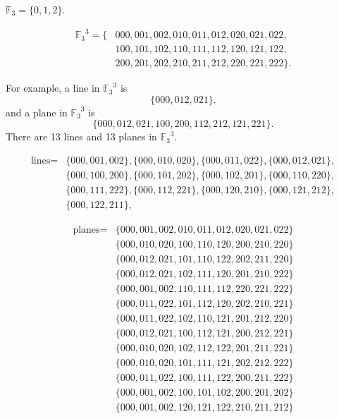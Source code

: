 \documentclass[14pt]{chalkfjord}
\begin{document}

\begin{frame}
  $\mathbb{F}_3 = \{ 0, 1, 2 \}$.

  \vfill\pause

  \begin{align*}
  {\mathbb{F}_3}^3 = \{
  & 000, 001, 002,
  010, 011, 012,
  020, 021, 022, \\
  & 100, 101, 102,
  110, 111, 112,
  120, 121, 122, \\
  & 200, 201, 202,
  210, 211, 212,
  220, 221, 222 \}.
  \end{align*}

  \vfill\pause
  For example, a line in ${\mathbb{F}_3}^3$ is
  $$
  \{ 000, 012, 021 \}.
  $$
  and a plane in ${\mathbb{F}_3}^3$ is
  $$
  \{ 000, 012, 021, 100, 200, 112, 212, 121, 221 \}.
  $$
  \pause
  There are 13 lines and 13 planes in ${\mathbb{F}_3}^3$.

\end{frame}

\begin{frame}
\scriptsize 
  \begin{align*}
    \mbox{lines} = & \{ 000,001,002 \}, \{ 000,010,020 \}, \{ 000,011,022 \}, \{ 000,012,021 \},\\
    & \{ 000,100,200 \}, \{ 000,101,202 \}, \{ 000,102,201 \}, \{ 000,110,220 \},\\
    & \{ 000,111,222 \}, \{ 000,112,221 \}, \{ 000,120,210 \}, \{ 000,121,212 \},\\
    & \{ 000,122,211 \},
  \end{align*}

  \begin{align*}
    \mbox{planes} = & \{ 000,001,002,010,011,012,020,021,022 \}\\
    & \{ 000,010,020,100,110,120,200,210,220 \}\\
    & \{ 000,012,021,101,110,122,202,211,220 \}\\
    & \{ 000,012,021,102,111,120,201,210,222 \}\\
    & \{ 000,001,002,110,111,112,220,221,222 \}\\
    & \{ 000,011,022,101,112,120,202,210,221 \}\\
    & \{ 000,011,022,102,110,121,201,212,220 \}\\
    & \{ 000,012,021,100,112,121,200,212,221 \}\\
    & \{ 000,010,020,102,112,122,201,211,221 \}\\
    & \{ 000,010,020,101,111,121,202,212,222 \}\\
    & \{ 000,011,022,100,111,122,200,211,222 \}\\
    & \{ 000,001,002,100,101,102,200,201,202 \}\\
    & \{ 000,001,002,120,121,122,210,211,212 \}
  \end{align*}
    
\end{frame}
\end{document}
